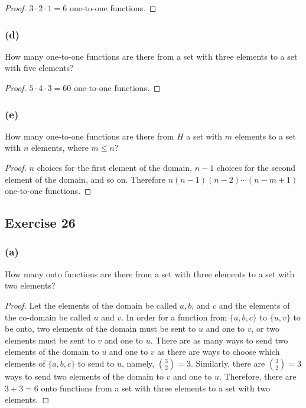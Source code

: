 \documentclass[14pt]{extarticle}
\begin{document}
\begin{proof}
     \(3 \cdot 2 \cdot 1 = 6\) one-to-one functions.
\end{proof}

\subsubsection{(d)}
How many one-to-one functions are there from a set with three elements to a set with five elements?

\begin{proof}
     \(5 \cdot 4 \cdot 3 = 60\) one-to-one functions.
\end{proof}

\subsubsection{(e)}
How many one-to-one functions are there from \(H\) a set with \(m\) elements to a set with \(n\) elements, where
\(m \leq n\)?

\begin{proof}
     \(n\) choices for the first element of the domain, \(n-1\) choices for the second element of the domain, and so on.
     Therefore \(n(n-1)(n-2)\cdots(n-m+1)\) one-to-one functions.
\end{proof}

\subsection{Exercise 26}
\subsubsection{(a)}
How many onto functions are there from a set with three elements to a set with two elements?

\begin{proof}
     Let the elements of the domain be called \(a, b\), and \(c\) and the elements of the co-domain be called \(u\) and \(v\).
     In order for a function from \(\{a, b, c\}\) to \(\{u, v\}\) to be onto, two elements of the domain must be sent to \(u\)
     and one to \(v\), or two elements must be sent to \(v\) and one to \(u\). There are as many ways to send two elements of
     the domain to \(u\) and one to \(v\) as there are ways to choose which elements of \(\{a, b, c\}\) to send to \(u\),
     namely, \(\binom{3}{2} = 3\). Similarly, there are \(\binom{3}{2} = 3\) ways to send two elements of the domain to \(v\) and
     one to \(u\). Therefore, there are \(3 + 3 = 6\) onto functions from a set with three elements to a set with two elements.
\end{proof}
\end{document}
